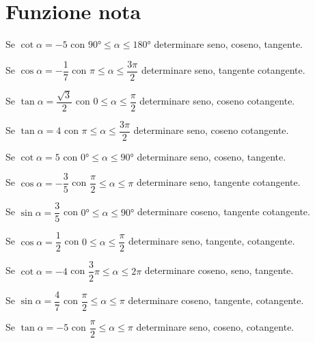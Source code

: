 \section{Funzione nota}
\begin{exercise}[no solution]
Se $\cot\alpha=-5$ con $\ang{90}\leq\alpha\leq\ang{180}$ determinare seno, coseno, tangente.
\end{exercise}
\begin{exercise}[no solution]
Se $\cos\alpha=-\dfrac{1}{7}$ con $\pi\leq\alpha\leq\dfrac{3\pi}{2}$ determinare seno, tangente cotangente.
\end{exercise}
\begin{exercise}[no solution]
	Se $\tan\alpha=\dfrac{\sqrt{3}}{2}$ con $0\leq\alpha\leq\dfrac{\pi}{2}$ determinare seno, coseno cotangente.
\end{exercise}
\begin{exercise}[no solution]
	Se $\tan\alpha=4$ con $\pi\leq\alpha\leq\dfrac{3\pi}{2}$ determinare seno, coseno cotangente.
\end{exercise}
\begin{exercise}[no solution]
	Se $\cot\alpha=5$ con $\ang{0}\leq\alpha\leq\ang{90}$ determinare seno, coseno, tangente.
\end{exercise}
\begin{exercise}[no solution]
	Se $\cos\alpha=-\dfrac{3}{5}$ con $\dfrac{\pi}{2}\leq\alpha\leq\pi$ determinare seno, tangente cotangente.
\end{exercise}
\begin{exercise}[no solution]
	Se $\sin\alpha=\dfrac{3}{5}$ con $\ang{0}\leq\alpha\leq\ang{90}$ determinare coseno, tangente cotangente.
\end{exercise}
\begin{exercise}[no solution]
	Se $\cos\alpha=\dfrac{1}{2}$ con $0\leq\alpha\leq\dfrac{\pi}{2}$ determinare seno, tangente, cotangente.
\end{exercise}
\begin{exercise}[no solution]
	Se $\cot\alpha=-4$ con $\dfrac{3}{2}\pi\leq\alpha\leq 2\pi$ determinare coseno, seno, tangente.
\end{exercise}
\begin{exercise}[no solution]
	Se $\sin\alpha=\dfrac{4}{7}$ con $\dfrac{\pi}{2}\leq\alpha\leq\pi$ determinare  coseno, tangente, cotangente.
\end{exercise}
\begin{exercise}[no solution]
	Se $\tan\alpha=-5$ con $\dfrac{\pi}{2}\leq\alpha\leq\pi$ determinare seno, coseno, cotangente.
\end{exercise}
